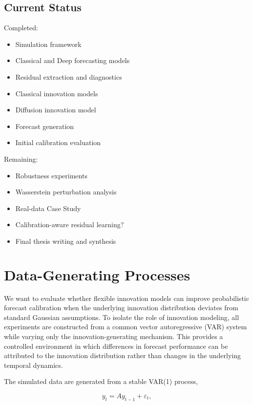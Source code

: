 \documentclass[11pt]{article}
\begin{document}
\subsection{Current Status}

Completed:
\begin{itemize}
    \item Simulation framework
    \item Classical and Deep forecasting models
    \item Residual extraction and diagnostics
    \item Classical innovation models
    \item Diffusion innovation model
    \item Forecast generation
    \item Initial calibration evaluation
\end{itemize}

Remaining:
\begin{itemize}
    \item Robustness experiments
    \item Wasserstein perturbation analysis
    \item Real-data Case Study
    \item Calibration-aware residual learning?
    \item Final thesis writing and synthesis
\end{itemize}

\section{Data-Generating Processes}

We want to evaluate whether flexible innovation models can improve probabilistic forecast calibration when the underlying innovation distribution deviates from standard Gaussian assumptions. To isolate the role of innovation modeling, all experiments are constructed from a common vector autoregressive (VAR) system while varying only the innovation-generating mechanism. This provides a controlled environment in which differences in forecast performance can be attributed to the innovation distribution rather than changes in the underlying temporal dynamics.

The simulated data are generated from a stable VAR(1) process,

\[
y_t = A y_{t-1} + \varepsilon_t,
\]
\end{document}
